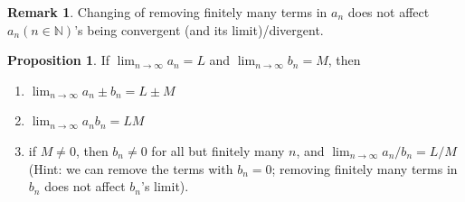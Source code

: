 \documentclass{book}
\theoremstyle{definition}
\newtheorem{remark}{Remark}[section]
\newtheorem{proposition}{Proposition}[section]
\begin{document}
\begin{remark}
Changing of removing finitely many terms in $a_n$ does not affect $a_n (n\in\mathbb{N})$'s being convergent (and its limit)/divergent. 
\end{remark}
\begin{proposition}
\label{propo:Arithmetic}
If $\lim_{n\to \infty} a_n = L$ and $\lim_{n\to \infty} b_n =M$, then 
\begin{enumerate}
    \item $\lim_{n\to \infty} a_n \pm b_n = L\pm M $
    \item $\lim_{n\to \infty} a_n b_n = LM $
    \item if $M\neq0$, then $b_n \neq 0$ for all but finitely many $n$, and $\lim_{n\to \infty} a_n/b_n = L/M $ (Hint: we can remove the terms with $b_n=0$; removing finitely many terms in $b_n$ does not affect $b_n$'s limit).
\end{enumerate}
\end{proposition}
\end{document}
